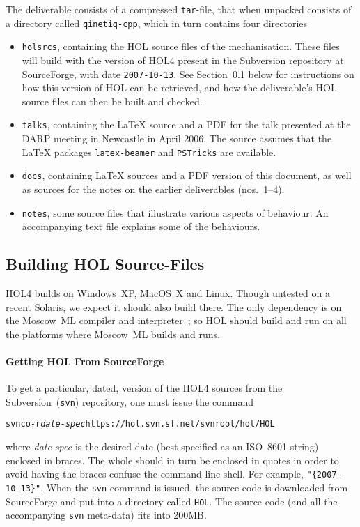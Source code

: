 \documentclass[11pt]{article}
\begin{document}
The deliverable consists of a compressed \texttt{tar}-file, that when
unpacked consists of a directory called \texttt{qinetiq-cpp}, which in
turn contains four directories
\begin{itemize}
\item \texttt{holsrcs}, containing the HOL source files of the
  mechanisation.  These files will build with the version of HOL4
  present in the Subversion repository at SourceForge, with date
  \texttt{2007-10-13}.  See Section~\ref{sec:getting-hol} below
  for instructions on how this version of HOL can be retrieved, and
  how the deliverable's HOL source files can then be built and
  checked.
\item \texttt{talks}, containing the \LaTeX{} source and a PDF for the
  talk presented at the DARP meeting in Newcastle in April 2006.  The
  source assumes that the \LaTeX{} packages \texttt{latex-beamer} and
  \texttt{PSTricks} are available.
\item \texttt{docs}, containing \LaTeX{} sources and a PDF version of
  this document, as well as sources for the notes on the earlier
  deliverables (nos.~1--4).
\item \texttt{notes}, some \cpp{} source files that illustrate various
  aspects of \cpp{} behaviour.  An accompanying text file explains some
  of the behaviours.
\end{itemize}

\subsection{Building HOL Source-Files}
\label{sec:getting-hol}

HOL4 builds on Windows~XP, MacOS~X and Linux.  Though untested on a
recent Solaris, we expect it should also build there.  The only
dependency is on the Moscow~ML compiler and interpreter~\cite{mosml};
so HOL should build and run on all the platforms where Moscow~ML
builds and runs.

\paragraph{Getting HOL From SourceForge}

To get a particular, dated, version of the HOL4 sources from the
Subversion~(\texttt{svn}) repository, one must issue the command
\begin{alltt}
   svn co -r \textit{date-spec} https://hol.svn.sf.net/svnroot/hol/HOL
\end{alltt}
where \textit{\ttfamily date-spec} is the desired date (best specified
as an ISO~8601 string) enclosed in braces.  The whole should in turn
be enclosed in quotes in order to avoid having the braces confuse the
command-line shell.  For example, \texttt{"\{2007-10-13\}"}.  When the
\texttt{svn} command is issued, the source code is downloaded from
SourceForge and put into a directory called \texttt{HOL}.  The source
code (and all the accompanying \texttt{svn} meta-data) fits into
200MB.
\end{document}
